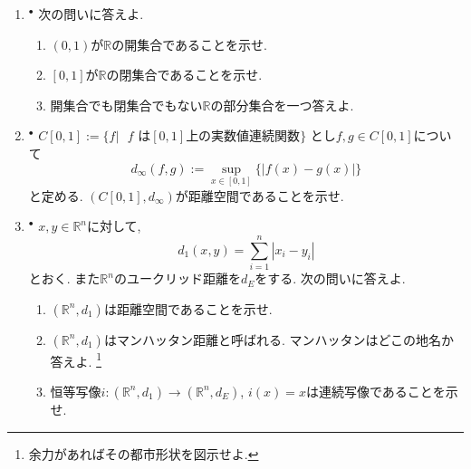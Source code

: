 \documentclass[dvipdfmx,a4paper,11pt]{article}
\newcommand{\R}{\mathbb{R}}
\theoremstyle{definition}
\begin{document}
\begin{enumerate}[label=\textbf{問}\ref*{sec-euc}.\arabic*]
 \setlength{\parskip}{0cm}
  \setlength{\itemsep}{7pt} 
\item $^{\bullet}$ 次の問いに答えよ.
\begin{enumerate}
 \setlength{\parskip}{0cm}
  \setlength{\itemsep}{0pt} 
\item $(0,1)$が$\R$の開集合であることを示せ.
\item $[0,1]$が$\R$の閉集合であることを示せ.
\item 開集合でも閉集合でもない$\R$の部分集合を一つ答えよ.
\end{enumerate}



\item \label{conti}$^{\bullet}$ 
$C[0,1]:= \{f | \text{ $f$ は$[0,1]$上の実数値連続関数} \}$
とし$f,g \in C[0,1]$について
$$
d_{\infty}(f,g) := \sup_{x \in [0,1]} \{ |f(x) - g(x)|\}
$$
と定める.  $(C[0,1],d_{\infty})$が距離空間であることを示せ.

\item  $^{\bullet}$ $x,y \in \R^n$に対して, 
$$
d_{1}(x,y) = \sum_{i=1}^{n} |x_i - y_i|
$$
とおく. また$\R^n$のユークリッド距離を$d_{E}$をする. 次の問いに答えよ.
\begin{enumerate}
 \setlength{\parskip}{0cm}
  \setlength{\itemsep}{0pt} 
\item $(\R^n, d_{1})$は距離空間であることを示せ. 
\item $(\R^n, d_{1})$はマンハッタン距離と呼ばれる. マンハッタンはどこの地名か答えよ. \footnote{余力があればその都市形状を図示せよ.}
\item 恒等写像$i : (\R^n, d_{1}) \to (\R^n, d_{E})$, $i(x)=x$は連続写像であることを示せ. 
\end{enumerate}



 


 


\end{enumerate}
\end{document}
